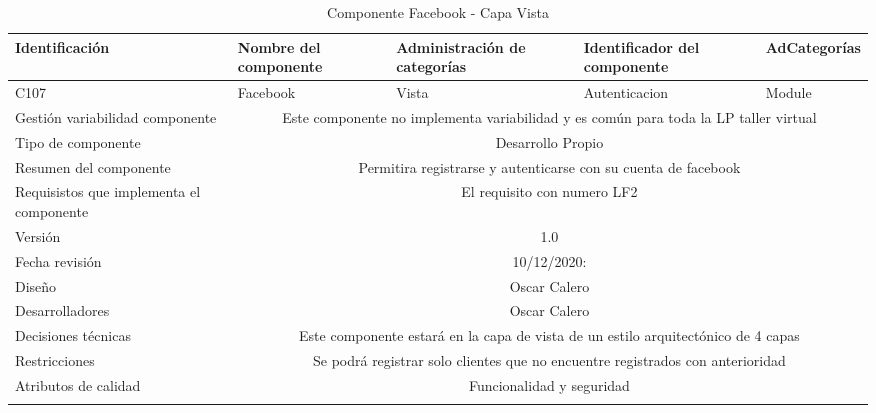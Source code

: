 \documentclass[10pt,a4paper,openany]{book}
\begin{document}
\begin{longtable}{|p{3cm}|p{3cm}|p{3cm}|p{3cm}|p{3cm}|} \hline
Identificación & Nombre del componente & Administración de categorías & Identificador del componente & AdCategorías \\[0.5ex] \hline
C107& Facebook& Vista& Autenticacion& Module\\[0.5ex] \hline
Gestión variabilidad componente & \multicolumn{4}{|c|}{Este componente no implementa variabilidad y es común para toda la LP taller virtual} \\ \hline
Tipo de componente & \multicolumn{4}{|c|}{Desarrollo Propio} \\ \hline
Resumen del componente & \multicolumn{4}{|c|}{Permitira registrarse y autenticarse con su cuenta de facebook} \\ \hline
Requisistos que implementa el componente & \multicolumn{4}{|c|}{El requisito con numero LF2 } \\ \hline
Versión & \multicolumn{4}{|c|}{1.0 } \\ \hline
Fecha revisión & \multicolumn{4}{|c|}{ 10/12/2020:} \\ \hline
Diseño & \multicolumn{4}{|c|}{Oscar Calero} \\ \hline
Desarrolladores & \multicolumn{4}{|c|}{Oscar Calero} \\ \hline
Decisiones técnicas & \multicolumn{4}{|c|}{Este componente estará en la capa de vista de un estilo arquitectónico de 4 capas  } \\ \hline
Restricciones & \multicolumn{4}{|c|}{Se podrá registrar solo clientes que no encuentre registrados con anterioridad} \\ \hline
Atributos de calidad & \multicolumn{4}{|c|}{Funcionalidad y seguridad} \\ \hline
\caption{Componente Facebook - Capa Vista}
\label{table:t6}
\end{longtable}
\end{document}
